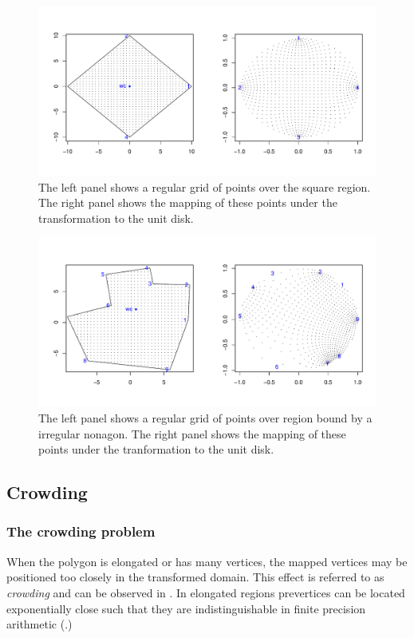 \begin{figure} [bp]
\centering
\includegraphics[scale=0.5]{sc/figs/squaredomain.pdf}
\caption{The left panel shows a regular grid of points over the square region. The right panel shows the mapping of these points under the \sch transformation to the unit disk.}
\label{squaredomain}
\end{figure}

\begin{figure} [tbp]
\centering
\includegraphics[scale=0.5]{sc/figs/irregulardomain.pdf}
\caption{The left panel shows a regular grid of points over region bound by a irregular nonagon. The right panel shows the mapping of these points under the \sch tranformation to the unit disk.}
\label{irregdomain}
\end{figure}

\subsection{Crowding}

\subsubsection{The crowding problem}
When the polygon is elongated or has many vertices, the mapped vertices may be positioned too closely in the transformed domain. This effect is referred to as \emph{crowding} and can be observed in . In elongated regions prevertices can be located exponentially close such that they are indistinguishable in finite precision arithmetic (\cite{howell90}.)

